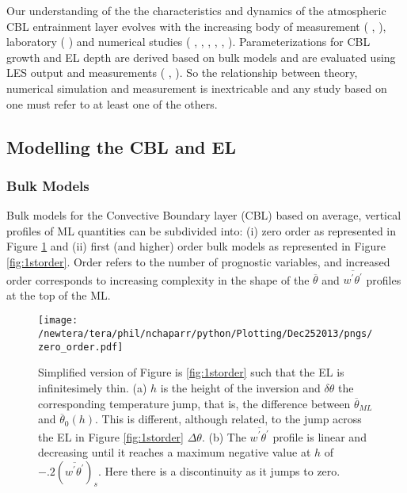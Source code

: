 Our understanding of the the characteristics and dynamics of the atmospheric \acs{CBL} entrainment layer evolves with the increasing body of measurement (\citeauthor{Traum11} \citeyear{Traum11}, \citeauthor{StullNelEl} \citeyear{StullNelEl}), laboratory (\citeauthor{DearWill80} \citeyear{DearWill80}) and numerical studies (\citeauthor{Deardorff72} \citeyear{Deardorff72}, \citeauthor{Sorbjan} \citeyear{Sorbjan}, \citeauthor{SullMoengStev} \citeyear{SullMoengStev}, \citeauthor{FedConzMir04} \citeyear{FedConzMir04}, \citeauthor{BrooksFowler2} \citeyear{BrooksFowler2}, \citeauthor{GarciaMellado} \citeyear{GarciaMellado}). Parameterizations for \acs{CBL} growth and \acs{EL} depth are derived based on bulk models and are evaluated using \acs{LES} output and measurements (\citeauthor{FedConzMir04} \citeyear{FedConzMir04}, \citeauthor{Boers89} \citeyear{Boers89}).  So the relationship between theory, numerical simulation and measurement is inextricable and any study based on one must refer to at least one of the others.\\  

\subsection{Modelling the CBL and EL}
\label{subsec:}

\subsubsection{Bulk Models}
\label{subsubsec:}
Bulk  models for the Convective Boundary layer (\acs{CBL}) based on average, vertical profiles of \acs{ML} quantities can be subdivided into: (i) zero order as represented in Figure \ref{fig:0order} and (ii) first (and higher) order bulk models as represented in Figure \ref{fig:1storder}. Order refers to the number of prognostic variables, and increased order corresponds to increasing complexity in the shape of the  $\overline{\theta}$ and $\overline{w^{'}\theta^{'}}$ profiles at the top of the \acs{ML}.\\

\begin{figure}[htbp]
    \centering
    \texttt{[image: /newtera/tera/phil/nchaparr/python/Plotting/Dec252013/pngs/zero\_order.pdf]}
    \caption[Zero order \acs{CBL}]{Simplified version of Figure is \ref{fig:1storder} such that the \acs{EL} is infinitesimely thin. (a) $h$ is the height of the  inversion and $\delta \theta$ the corresponding temperature jump, that is, the difference between $\overline{\theta}_{ML}$ and $\overline{\theta}_{0}(h)$. This is different, although related, to the jump across the \acs{EL} in Figure \ref{fig:1storder} $\Delta \theta$. (b) The $\overline{w^{'}\theta^{'}}$ profile is linear and decreasing until it reaches a maximum negative value at $h$ of $-.2(\overline{w^{'}\theta^{'}})_{s}$. Here there is a discontinuity as it jumps to zero.}
    \label{fig:0order}   %
\end{figure}

